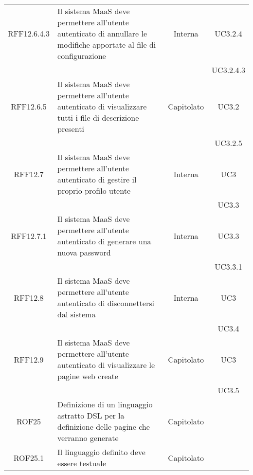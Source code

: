 \begin{longtable}{|c|p{6cm}|c|c|}
\midrule
RFF12.6.4.3
& Il sistema MaaS deve permettere all'utente autenticato di annullare le modifiche apportate al file di configurazione
& Interna
& UC3.2.4\\
& & & UC3.2.4.3\\

\midrule
RFF12.6.5
& Il sistema MaaS deve permettere all'utente autenticato di visualizzare tutti i file di descrizione presenti
& Capitolato
& UC3.2\\
& & & UC3.2.5\\

\midrule
RFF12.7
& Il sistema MaaS deve permettere all'utente autenticato di gestire il proprio profilo utente
& Interna
& UC3\\
& & & UC3.3\\

\midrule
RFF12.7.1
& Il sistema MaaS deve permettere all'utente autenticato di generare una nuova password
& Interna
& UC3.3\\
& & & UC3.3.1\\

\midrule
RFF12.8
& Il sistema MaaS deve permettere all'utente autenticato di disconnettersi dal sistema
& Interna
& UC3\\
& & & UC3.4\\

\midrule
RFF12.9
& Il sistema MaaS deve permettere all'utente autenticato di visualizzare le pagine web create
& Capitolato
& UC3\\
& & & UC3.5\\

\midrule
ROF25
& Definizione di un linguaggio astratto DSL per la definizione delle pagine che verranno generate
& Capitolato
&
\\

\midrule
ROF25.1
& Il linguaggio definito deve essere testuale
& Capitolato
&
\\

\end{longtable}
\newpage
